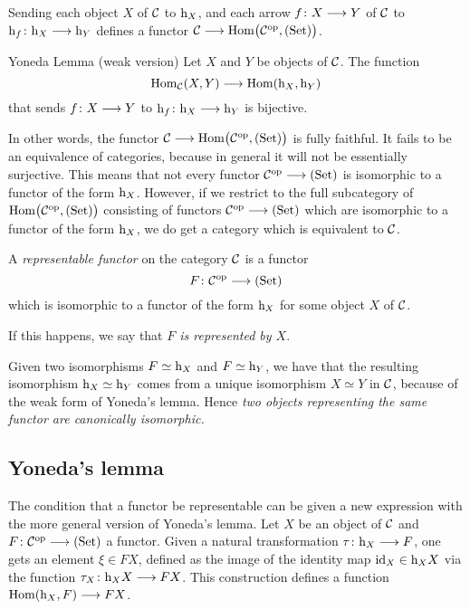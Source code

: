 \begin{2   CONTRAVARIANT FUNCTORS}
\begin{2.1 Yoneda Lemma}
Sending each object $X$ of $\mathcal{C}$ to $\mathrm{h}_X$, and each arrow $f \colon X \arr Y$ of $\mathcal{C}$ to $\h_f \colon \h_X \arr \h_Y$ defines a functor $\cC \arr \func{\cC}$.

\begin{named}{Yoneda Lemma (weak version)}
Let $X$ and $Y$ be
objects of $\mathcal{C}$. The function
   \[
   \hom_\cC(X, Y) \arr
   \hom (\h_X, \h_Y)
   \]
that sends $f \colon X \arr Y$ to $\h_f \colon \h_X \arr \h_Y$ is bijective. 
\end{named}

In other words, the functor $\cC \arr \func{\cC}$ is fully faithful. It fails to be an equivalence of categories, because in general it will not be essentially surjective. This means that not every functor $\cC\op \arr \catset$ is isomorphic to a functor of the form $\mathrm{h}_X$. However, if we restrict to the full subcategory of $\mathrm{Hom}\bigl(\mathcal{C}^{\mathrm{op}}, (\mathrm{Set})\bigr)$ consisting of functors $\cC\op \arr \catset$ which are isomorphic to a functor of the form $\mathrm{h}_X$, we do get a category which is equivalent to $\mathcal{C}$.

\begin{definition} A \emph{representable functor}%
%
 on the category $\mathcal{C}$ is a functor
   \[
   F \colon \cC\op \arr \catset
   \] which is isomorphic to a functor of the form $\mathrm{h}_X$ for some object $X$ of $\mathcal{C}$. 

If this happens, we say that \emph{$F$ is represented by $X$}.
\end{definition}

Given two isomorphisms $F \simeq \mathrm{h}_X$ and $F \simeq \mathrm{h}_Y$, we have that the resulting isomorphism $\mathrm{h}_X \simeq \mathrm{h}_Y$ comes from a unique isomorphism $X \simeq Y$ in $\mathcal{C}$, because of the weak form of Yoneda's lemma. Hence \emph{two objects representing the same functor are canonically isomorphic.}
 
\subsection{Yoneda's lemma}

The condition that a functor be representable can be given a new expression with the more general version of Yoneda's lemma. Let $X$ be an object of $\mathcal{C}$ and $F \colon \cC\op \arr \catset$ a functor. Given a natural transformation $\tau\colon \h_X \arr F$, one gets an element $\xi \in F X$, defined as the image of the identity map $\mathrm{id}_X \in \mathrm{h}_X X$ via the function $\tau_X\colon \h_X X \arr F X$. This construction defines a function $\hom(\h_X, F) \arr F X$.
 

\end{2.1 Yoneda Lemma}
\end{2   CONTRAVARIANT FUNCTORS}
